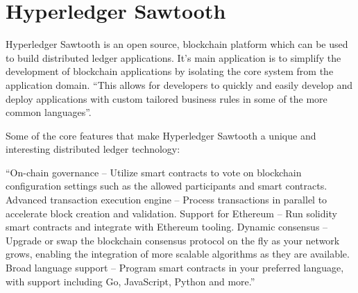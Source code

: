 \section{Hyperledger Sawtooth}

Hyperledger Sawtooth is an open source, blockchain platform which can
be used to build distributed ledger applications. It’s main
application is to simplify the development of blockchain applications
by isolating the core system from the application domain. ``This
allows for developers to quickly and easily develop and deploy
applications with custom tailored business rules in some of the more
common languages''\cite{hid-sp18-414-Hyperledger_Sawtooth}.

Some of the core features that make Hyperledger Sawtooth a unique and
interesting distributed ledger technology:
  
``On-chain governance – Utilize smart contracts to vote on blockchain
configuration settings such as the allowed participants and smart
contracts.  Advanced transaction execution engine – Process
transactions in parallel to accelerate block creation and validation.
Support for Ethereum – Run solidity smart contracts and integrate with
Ethereum tooling.  Dynamic consensus – Upgrade or swap the blockchain
consensus protocol on the fly as your network grows, enabling the
integration of more scalable algorithms as they are available.  Broad
language support – Program smart contracts in your preferred language,
with support including Go, JavaScript, Python and 
more.''\cite{hid-sp18-414-Linux_Foundation_Sawtooth}
